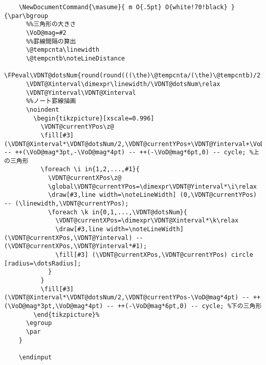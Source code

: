 \documentclass[a4paper,12pt]{article}
\begin{document}
\begin{lstlisting}
    \NewDocumentCommand{\masume}{ m O{.5pt} O{white!70!black} }{\par\bgroup
      %%三角形の大きさ
      \VoD@mag=#2
      %%罫線間隔の算出
      \@tempcnta\linewidth
      \@tempcntb\noteLineDistance
      \FPeval\VDNT@dotsNum{round(round(((\the)\@tempcnta/(\the)\@tempcntb)/2:0)*2:0)}%
      \VDNT@Xinterval\dimexpr\linewidth/\VDNT@dotsNum\relax
      \VDNT@Yinterval\VDNT@Xinterval
      %%ノート罫線描画
      \noindent
        \begin{tikzpicture}[xscale=0.996]
          \VDNT@currentYPos\z@
          \fill[#3] (\VDNT@Xinterval*\VDNT@dotsNum/2,\VDNT@currentYPos+\VDNT@Yinterval+\VoD@mag*4pt) -- ++(\VoD@mag*3pt,-\VoD@mag*4pt) -- ++(-\VoD@mag*6pt,0) -- cycle; %上の三角形
          \foreach \i in{1,2,...,#1}{ 
            \VDNT@currentXPos\z@
            \global\VDNT@currentYPos=\dimexpr\VDNT@Yinterval*\i\relax
            \draw[#3,line width=\noteLineWidth] (0,\VDNT@currentYPos) -- (\linewidth,\VDNT@currentYPos);
            \foreach \k in{0,1,...,\VDNT@dotsNum}{
              \VDNT@currentXPos=\dimexpr\VDNT@Xinterval*\k\relax
              \draw[#3,line width=\noteLineWidth] (\VDNT@currentXPos,\VDNT@Yinterval) -- (\VDNT@currentXPos,\VDNT@Yinterval*#1);
              \fill[#3] (\VDNT@currentXPos,\VDNT@currentYPos) circle [radius=\dotsRadius];
            }
          }
          \fill[#3] (\VDNT@Xinterval*\VDNT@dotsNum/2,\VDNT@currentYPos-\VoD@mag*4pt) -- ++(\VoD@mag*3pt,\VoD@mag*4pt) -- ++(-\VoD@mag*6pt,0) -- cycle; %下の三角形
        \end{tikzpicture}%
      \egroup
      \par
    }

    \endinput
  \end{lstlisting}
\end{document}

